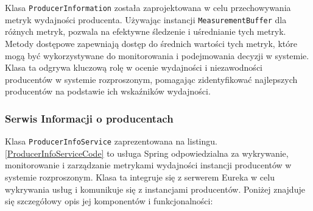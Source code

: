 Klasa \verb|ProducerInformation| została zaprojektowana w celu przechowywania metryk wydajności producenta. Używając instancji \verb|MeasurementBuffer| dla różnych metryk, pozwala na efektywne śledzenie i uśrednianie tych metryk. Metody dostępowe zapewniają dostęp do średnich wartości tych metryk, które mogą być wykorzystywane do monitorowania i podejmowania decyzji w systemie. Klasa ta odgrywa kluczową rolę w ocenie wydajności i niezawodności producentów w systemie rozproszonym, pomagając zidentyfikować najlepszych producentów na podstawie ich wskaźników wydajności.

\subsubsection{Serwis Informacji o producentach}

Klasa \verb|ProducerInfoService| zaprezentowana na listingu.\ref{ProducerInfoServiceCode} to usługa Spring odpowiedzialna za wykrywanie, monitorowanie i zarządzanie metrykami wydajności instancji producentów w systemie rozproszonym. Klasa ta integruje się z serwerem Eureka w celu wykrywania usług i komunikuje się z instancjami producentów. Poniżej znajduje się szczegółowy opis jej komponentów i funkcjonalności:

